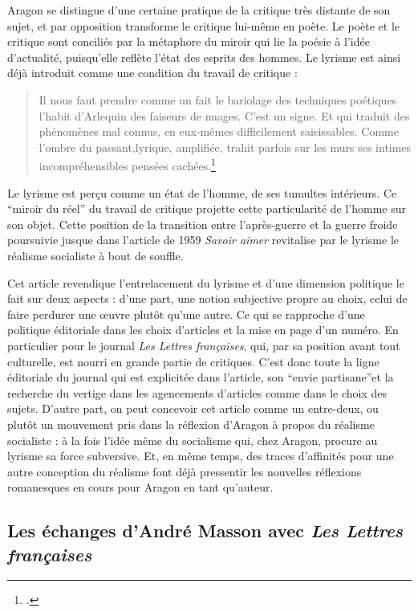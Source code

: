  Aragon se distingue d'une certaine pratique de la critique très distante de son sujet, et par opposition transforme le critique lui-même en poète. Le poète et le critique sont conciliés par la métaphore du miroir qui lie la poésie à l'idée d'actualité, puisqu'elle reflète l'état des esprits des hommes. Le lyrisme est ainsi déjà introduit comme une condition du travail de critique :

\begin{quote}Il nous faut prendre comme un fait le bariolage des techniques poétiques l’habit d’Arlequin des faiseurs de nuages. C’est un signe. Et qui traduit des phénomènes mal connus, en eux-mêmes difficilement saisissables. Comme l’ombre du passant,lyrique, amplifiée, trahit parfois sur les murs ses intimes incompréhensibles pensées cachées.\footcite[p94]{belcanto}\end{quote}

Le lyrisme est perçu comme un état de l'homme, de ses tumultes intérieurs. Ce \enquote{miroir du réel} du travail de critique projette cette particularité de l'homme sur son objet. Cette position de la transition entre l'après-guerre et la guerre froide poursuivie jusque dans l'article de 1959 \emph{Savoir aimer} revitalise par le lyrisme le réalisme socialiste à bout de souffle.


	Cet article revendique l’entrelacement du lyrisme et d'une dimension politique le fait sur deux aspects : d'une part, une notion subjective propre au choix, celui de faire perdurer une \oe{}uvre plutôt qu’une autre. Ce qui se rapproche d’une politique éditoriale dans les choix d’articles et la mise en page d’un numéro. En particulier pour le journal \emph{Les Lettres françaises}, qui, par sa position avant tout culturelle, est nourri en grande partie de critiques. C’est donc toute la ligne éditoriale du journal qui est explicitée dans l’article, son \enquote{envie partisane}et la recherche du vertige dans les agencements d’articles comme dans le choix des sujets. D’autre part, on peut concevoir cet article comme un entre-deux, ou plutôt un mouvement pris dans la réflexion d’Aragon à propos du réalisme socialiste : à la fois l’idée même du socialisme qui, chez Aragon, procure au lyrisme sa force subversive. Et, en même temps, des traces d’affinités pour une autre conception du réalisme font déjà pressentir les nouvelles réflexions romanesques en cours pour Aragon en tant qu’auteur. 

	

\subsection{Les échanges d'André Masson avec \emph{Les Lettres françaises }}


